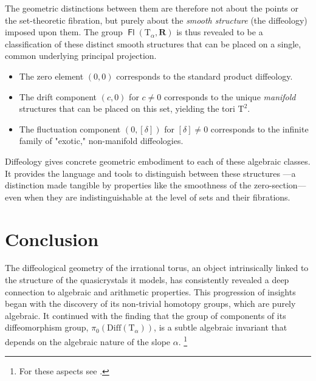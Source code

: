 \documentclass[10pt,letterpaper,reqno]{amsart}
\newcommand{\RR}{\mathbf{R}}
\newcommand{\T}{\mathrm{T}}
\DeclareMathOperator{\Fb}{\boldsymbol{\mathsf{Fl}}}
\newcommand{\Diff}{\mathrm{Diff}}
\begin{document}
    The geometric distinctions between them are therefore not about the points or the set-theoretic fibration,
    but purely about the \emph{smooth structure} (the diffeology) imposed upon them.
    The group $\Fb(\T_\alpha, \RR)$ is thus revealed to be a classification of these distinct smooth structures that can be placed on a single,
    common underlying principal projection.
    \begin{itemize}
      \item[--] The zero element $(0, 0)$ corresponds to the standard product diffeology.
      \item[--] The drift component $(c, 0)$ for $c \neq 0$ corresponds to the unique \emph{manifold} structures that can be placed on this set,
      yielding the tori $\T^2$.
      \item[--] The fluctuation component $(0, [\delta])$ for $[\delta] \neq 0$ corresponds to the infinite family of "exotic,"
      non-manifold diffeologies.
    \end{itemize}
    Diffeology gives concrete geometric embodiment to each of these algebraic classes.
    It provides the language and tools to distinguish between these structures
    ---a distinction made tangible by properties like the smoothness of the zero-section---
    even when they are indistinguishable at the level of sets and their fibrations.
        
    
    
    \section{Conclusion}
    
    The diffeological geometry of the irrational torus,
    an object intrinsically linked to the structure of the quasicrystals it models,
    has consistently revealed a deep connection to algebraic and arithmetic properties.
    This progression of insights began with the discovery of its non-trivial homotopy groups, which are purely algebraic.
    It continued with the finding that the group of components of its diffeomorphism group,
    $\pi_0(\Diff(\T_\alpha))$,
    is a subtle algebraic invariant that depends on the algebraic nature of the slope $\alpha$.%
    \footnote{For these aspects see \cite{DIZ83, IZL90}.}
    
\end{document}
